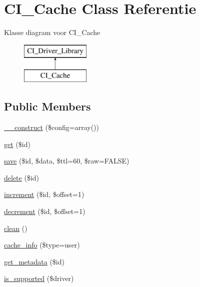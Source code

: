 \hypertarget{class_c_i___cache}{}\section{C\+I\+\_\+\+Cache Class Referentie}
\label{class_c_i___cache}
Klasse diagram voor C\+I\+\_\+\+Cache\begin{figure}[H]
\begin{center}
\leavevmode
\includegraphics[height=2.000000cm]{class_c_i___cache}
\end{center}
\end{figure}
\subsection*{Public Members}
\begin{DoxyCompactItemize}
\item 
\mbox{\hyperlink{class_c_i___cache_af7f9493844d2d66e924e3c1df51ce616}{\+\_\+\+\_\+construct}} (\$config=array())
\item 
\mbox{\hyperlink{class_c_i___cache_a50e3bfb586b2f42932a6a93f3fbb0828}{get}} (\$id)
\item 
\mbox{\hyperlink{class_c_i___cache_a472645db04a8ce4b040b789a3062a7d2}{save}} (\$id, \$data, \$ttl=60, \$raw=F\+A\+L\+SE)
\item 
\mbox{\hyperlink{class_c_i___cache_a2f8258add505482d7f00ea26493a5723}{delete}} (\$id)
\item 
\mbox{\hyperlink{class_c_i___cache_a2f07a4e09b57f4460d49852497d1808f}{increment}} (\$id, \$offset=1)
\item 
\mbox{\hyperlink{class_c_i___cache_a4eb1c2772c8efc48c411ea060dd040b7}{decrement}} (\$id, \$offset=1)
\item 
\mbox{\hyperlink{class_c_i___cache_adb40b812890a8bc058bf6b7a0e1a54d9}{clean}} ()
\item 
\mbox{\hyperlink{class_c_i___cache_a26b8f7eef651dc3c0b5b9e1d8661a9ae}{cache\+\_\+info}} (\$type=\textquotesingle{}user\textquotesingle{})
\item 
\mbox{\hyperlink{class_c_i___cache_a59635cf18e997c5141bffa05ff7622e0}{get\+\_\+metadata}} (\$id)
\item 
\mbox{\hyperlink{class_c_i___cache_a6901d466745bfdfe4dc772fa012c99eb}{is\+\_\+supported}} (\$driver)
\end{DoxyCompactItemize}
